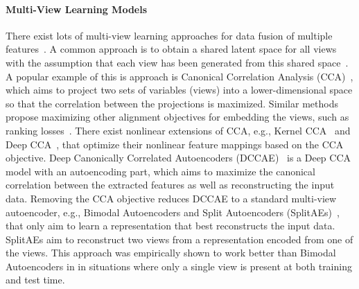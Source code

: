 \paragraph{Multi-View Learning Models} There exist lots of multi-view learning approaches for data fusion of multiple features~. A common approach is to obtain a shared latent space for all views with the assumption that each view has been generated from this shared space~. A popular example of this is approach is Canonical Correlation Analysis (CCA)~, which aims to project two sets of variables (views) into a lower-dimensional space so that the correlation between the projections is maximized. Similar methods propose maximizing other alignment objectives for embedding the views, such as ranking losses~. 
There exist nonlinear extensions of CCA, e.g., Kernel CCA~ and Deep CCA~, that optimize their nonlinear feature mappings based on the CCA objective. 
Deep Canonically Correlated Autoencoders (DCCAE)~ is a Deep CCA model with an autoencoding part, which aims to maximize the canonical correlation between the extracted features as well as reconstructing the input data. 
Removing the CCA objective reduces DCCAE to a standard multi-view autoencoder, e.g., Bimodal Autoencoders and Split Autoencoders (SplitAEs)~, that only aim to learn a representation that best reconstructs the input data. SplitAEs aim to reconstruct two views from a representation encoded from one of the views. This approach was empirically shown to work better than Bimodal Autoencoders in  in situations where only a single view is present at both training and test time.

